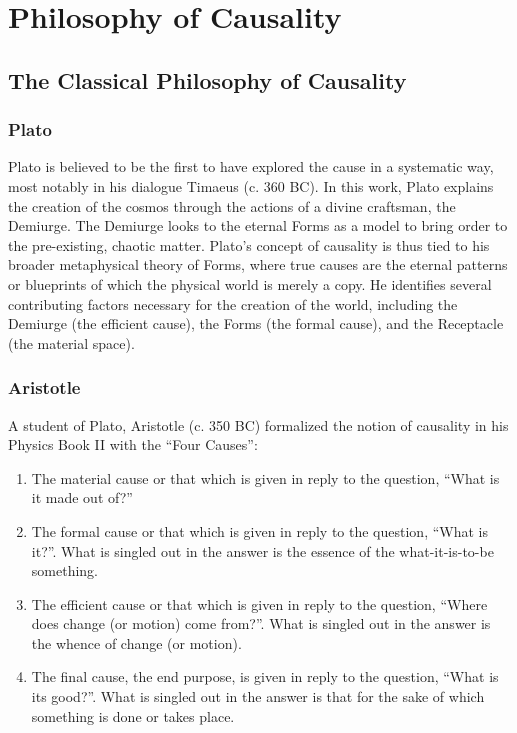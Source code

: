 \section{Philosophy of Causality}
\label{sec:philosophy}

\subsection{The Classical Philosophy of Causality}
\label{sec:philosophy_foundation}


\subsubsection{Plato}
\label{sec:history_plato}

Plato is believed to be the first to have explored the cause in a systematic way, most notably in his dialogue Timaeus\cite{archer1888timaeus} (c. 360 BC). In this work, Plato explains the creation of the cosmos through the actions of a divine craftsman, the Demiurge. The Demiurge looks to the eternal Forms as a model to bring order to the pre-existing, chaotic matter. Plato’s concept of causality is thus tied to his broader metaphysical theory of Forms, where true causes are the eternal patterns or blueprints of which the physical world is merely a copy. He identifies several contributing factors necessary for the creation of the world, including the Demiurge (the efficient cause), the Forms (the formal cause), and the Receptacle (the material space)\cite{archer1888timaeus}. 

\subsubsection{Aristotle}
\label{sec:history_aristotle}

A student of Plato, Aristotle (c. 350 BC) formalized the notion of causality in his Physics Book II with the ``Four Causes''\cite{falcon2006aristotlecausality}:

\begin{enumerate}
    \item The material cause or that which is given in reply to the question, ``What is it made out of?''
    \item The formal cause or that which is given in reply to the question, ``What is it?''. What is singled out in the answer is the essence of the what-it-is-to-be something.
    \item The efficient cause or that which is given in reply to the question, ``Where does change (or motion) come from?''. What is singled out in the answer is the whence of change (or motion).
    \item The final cause, the end purpose, is given in reply to the question, ``What is its good?''. What is singled out in the answer is that for the sake of which something is done or takes place.
\end{enumerate}

